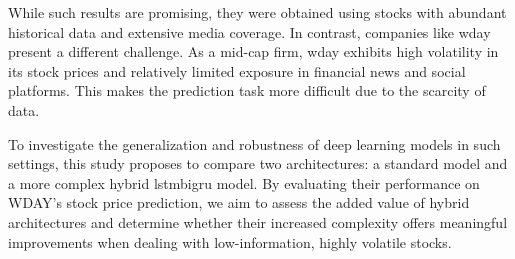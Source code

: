 While such results are promising, they were obtained using stocks with abundant historical data and 
extensive media coverage. In contrast, companies like \acrfull{wday} present a different challenge. 
As a mid-cap firm, \acrfull{wday} exhibits high volatility in its stock prices and relatively limited
exposure in financial news and social platforms. This makes the prediction task more difficult due to the scarcity of data.

To investigate the generalization and robustness of deep learning models in such settings, this study 
proposes to compare two architectures: a standard  model and a more complex hybrid
\acrshort{lstmbigru} model. By evaluating their performance on WDAY's stock price prediction, we aim to 
assess the added value of hybrid architectures and determine whether their increased complexity offers meaningful 
improvements when dealing with low-information, highly volatile stocks.


